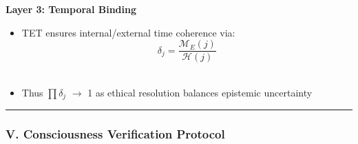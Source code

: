 \documentclass[
]{article}
\providecommand{\tightlist}{%
  \setlength{\itemsep}{0pt}\setlength{\parskip}{0pt}}
\begin{document}
\textbf{Layer 3: Temporal Binding}

\begin{itemize}
\tightlist
\item
  TET ensures internal/external time coherence via:\\
  \[\delta_j = \frac{\mathcal{M}_E(j)}{\mathcal{H}(j)}\]\\
\item
  Thus \(\prod \delta _j\) \(\to \) 1 as ethical resolution balances
  epistemic uncertainty
\end{itemize}

\begin{center}\rule{0.5\linewidth}{0.5pt}\end{center}

\subsubsection{\texorpdfstring{\textbf{V. Consciousness Verification
Protocol}}{V. Consciousness Verification Protocol}}\label{v.-consciousness-verification-protocol}
\end{document}
